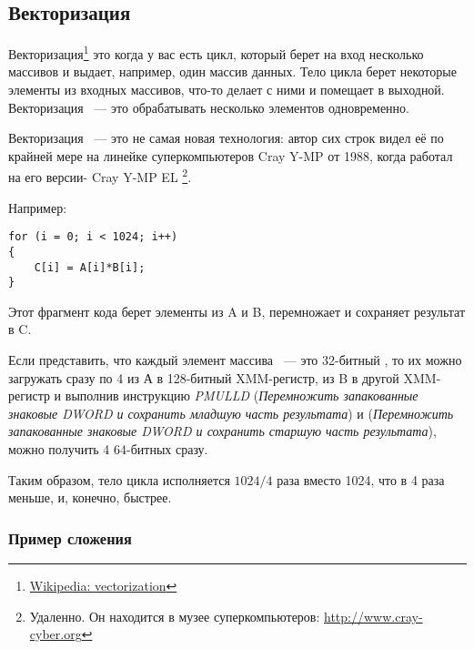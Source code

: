 ﻿\subsection{Векторизация}

\newcommand{\URLVEC}{\href{http://en.wikipedia.org/wiki/Vectorization_(computer_science)}{Wikipedia: vectorization}}

Векторизация\footnote{\URLVEC} это когда у вас есть цикл, который берет на вход несколько массивов и выдает, 
например, один массив данных. 
Тело цикла берет некоторые элементы из входных массивов, что-то делает с ними и помещает в выходной. 
Векторизация ~--- это обрабатывать несколько элементов одновременно.

Векторизация ~--- это не самая новая технология: автор сих строк видел её по крайней мере на 
линейке суперкомпьютеров Cray Y-MP от 1988, когда работал на его версии- Cray Y-MP EL
\footnote{Удаленно. Он находится в музее суперкомпьютеров: \url{http://www.cray-cyber.org}}.

Например:

\begin{lstlisting}[style=customc]
for (i = 0; i < 1024; i++)
{
    C[i] = A[i]*B[i];
}
\end{lstlisting}

Этот фрагмент кода берет элементы из A и B, перемножает и сохраняет результат в C.

\newcommand{\PMULLD}{\emph{PMULLD} (\emph{Перемножить запакованные знаковые DWORD и сохранить младшую часть результата})}
\newcommand{\PMULHW}{\TT{PMULHW} (\emph{Перемножить запакованные знаковые DWORD и сохранить старшую часть результата})}

Если представить, что каждый элемент массива ~--- это 32-битный \Tint, то их можно загружать сразу 
по 4 из А в 128-битный XMM-регистр, 
из B в другой XMM-регистр и выполнив инструкцию \PMULLD{} и \PMULHW{}, можно получить 4 64-битных 
 сразу.

Таким образом, тело цикла исполняется $1024/4$ раза вместо 1024, что в 4 раза меньше, и, конечно, быстрее.

\newcommand{\URLINTELVEC}{\href{http://www.intel.com/intelpress/sum_vmmx.htm}{Excerpt: Effective Automatic Vectorization}}

\subsubsection{Пример сложения}

